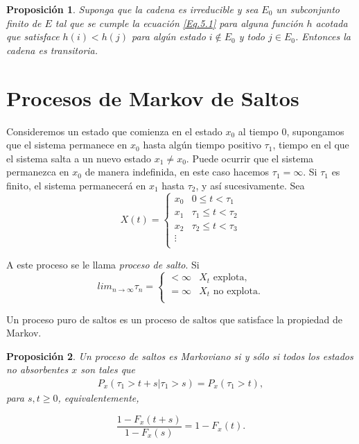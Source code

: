 \documentclass{article}
\newtheorem{Prop}{Proposición}[section]
\numberwithin{equation}{section}
\begin{document}
\begin{Prop}\label{Prop.5.4}
Suponga que la cadena es irreducible y sea $E_{0}$ un subconjunto finito de $E$ tal que se cumple la ecuaci\'on \ref{Eq.5.1} para alguna funci\'on $h$ acotada que satisface $h\left(i\right)<h\left(j\right)$ para alg\'un estado $i\notin E_{0}$ y todo $j\in E_{0}$. Entonces la cadena es transitoria.
\end{Prop}

%
\section{Procesos de Markov de Saltos}

Consideremos un estado que comienza en el estado $x_{0}$ al tiempo $0$, supongamos que el sistema permanece en $x_{0}$ hasta alg\'un tiempo positivo $\tau_{1}$, tiempo en el que el sistema salta a un nuevo estado $x_{1}\neq x_{0}$. Puede ocurrir que el sistema permanezca en $x_{0}$ de manera indefinida, en este caso hacemos $\tau_{1}=\infty$. Si $\tau_{1}$ es finito, el sistema permanecer\'a en $x_{1}$ hasta $\tau_{2}$, y as\'i sucesivamente.
Sea
\begin{equation}
X\left(t\right)=\left\{\begin{array}{cc}
x_{0} & 0\leq t<\tau_{1}\\
x_{1} & \tau_{1}\leq t<\tau_{2}\\
x_{2} & \tau_{2}\leq t<\tau_{3}\\
\vdots &\\
\end{array}\right.
\end{equation}

A este proceso  se le llama {\em proceso de salto}. Si
\begin{equation}
lim_{n\rightarrow\infty}\tau_{n}=\left\{\begin{array}{cc}
<\infty & X_{t}\textrm{ explota,}\\
=\infty & X_{t}\textrm{ no explota.}\\
\end{array}\right.
\end{equation}

Un proceso puro de saltos es un proceso de saltos que satisface la propiedad de Markov.

\begin{Prop}
Un proceso de saltos es Markoviano si y s\'olo si todos los estados no absorbentes $x$ son tales que
\begin{eqnarray*}
P_{x}\left(\tau_{1}>t+s|\tau_{1}>s\right)=P_{x}\left(\tau_{1}>t\right),
\end{eqnarray*}
para $s,t\geq0$, equivalentemente,

\begin{equation}\label{Eq.5}
\frac{1-F_{x}\left(t+s\right)}{1-F_{x}\left(s\right)}=1-F_{x}\left(t\right).
\end{equation}
\end{Prop}
\end{document}
